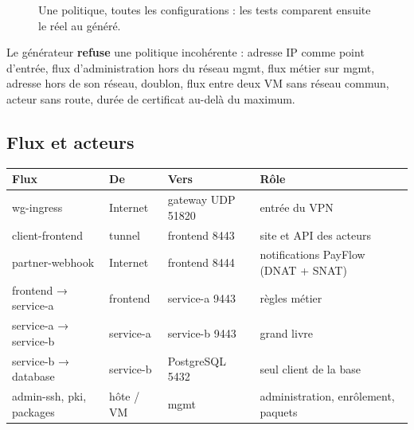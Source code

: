 \documentclass[11pt,a4paper]{article}
\begin{document}
\begin{figure}[H]
\centering
{}
\caption{Une politique, toutes les configurations : les tests comparent ensuite le réel au généré.}
\end{figure}

Le générateur \textbf{refuse} une politique incohérente : adresse IP comme point d'entrée, flux
d'administration hors du réseau mgmt, flux métier sur mgmt, adresse hors de son réseau, doublon,
flux entre deux VM sans réseau commun, acteur sans route, durée de certificat au-delà du maximum.

\subsection{Flux et acteurs}
\begin{center}
\begin{tabularx}{\linewidth}{@{}lll L@{}}
\toprule
\textbf{Flux} & \textbf{De} & \textbf{Vers} & \textbf{Rôle}\\
\midrule
wg-ingress & Internet & gateway UDP 51820 & entrée du VPN\\
client-frontend & tunnel & frontend 8443 & site et API des acteurs\\
partner-webhook & Internet & frontend 8444 & notifications PayFlow (DNAT + SNAT)\\
frontend → service-a & frontend & service-a 9443 & règles métier\\
service-a → service-b & service-a & service-b 9443 & grand livre\\
service-b → database & service-b & PostgreSQL 5432 & seul client de la base\\
admin-ssh, pki, packages & hôte / VM & mgmt & administration, enrôlement, paquets\\
\bottomrule
\end{tabularx}
\end{center}
\end{document}
